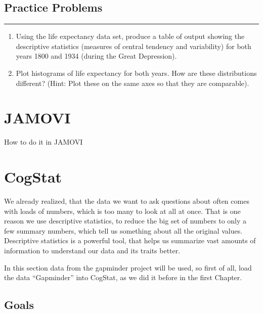 \documentclass[
]{book}
\begin{document}
\hypertarget{practice-problems-1}{%
\subsection{Practice Problems}\label{practice-problems-1}}

\begin{center}\rule{0.5\linewidth}{0.5pt}\end{center}

\begin{enumerate}
\def\labelenumi{\arabic{enumi}.}
\item
  Using the life expectancy data set, produce a table of output showing the descriptive statistics (measures of central tendency and variability) for both years 1800 and 1934 (during the Great Depression).
\item
  Plot histograms of life expectancy for both years. How are these distributions different? (Hint: Plot these on the same axes so that they are comparable).
\end{enumerate}

\hypertarget{jamovi-2}{%
\section{JAMOVI}\label{jamovi-2}}

How to do it in JAMOVI

\hypertarget{cogstat-3}{%
\section{CogStat}\label{cogstat-3}}

We already realized, that the data we want to ask questions about often comes with loads of numbers, which is too many to look at all at once. That is one reason we use descriptive statistics, to reduce the big set of numbers to only a few summary numbers, which tell us something about all the original values. Descriptive statistics is a powerful tool, that helps us summarize vast amounts of information to understand our data and its traits better.

In this section data from the gapminder project will be used, so first of all, load the data ``Gapminder'' into CogStat, as we did it before in the first Chapter.

\hypertarget{goals-1}{%
\subsection{Goals}\label{goals-1}}
\end{document}
